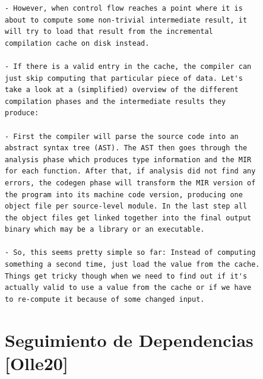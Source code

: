 \documentclass[12pt, a4paper]{report}
\begin{document}
\begin{verbatim}
- However, when control flow reaches a point where it is
about to compute some non-trivial intermediate result, it
will try to load that result from the incremental
compilation cache on disk instead.

- If there is a valid entry in the cache, the compiler can
just skip computing that particular piece of data. Let's
take a look at a (simplified) overview of the different
compilation phases and the intermediate results they
produce:

- First the compiler will parse the source code into an
abstract syntax tree (AST). The AST then goes through the
analysis phase which produces type information and the MIR
for each function. After that, if analysis did not find any
errors, the codegen phase will transform the MIR version of
the program into its machine code version, producing one
object file per source-level module. In the last step all
the object files get linked together into the final output
binary which may be a library or an executable.

- So, this seems pretty simple so far: Instead of computing
something a second time, just load the value from the cache.
Things get tricky though when we need to find out if it's
actually valid to use a value from the cache or if we have
to re-compute it because of some changed input.
\end{verbatim}
\cite{rust_blog_incremental_compilation}

\section*{Seguimiento de Dependencias [Olle20]}
\end{document}
